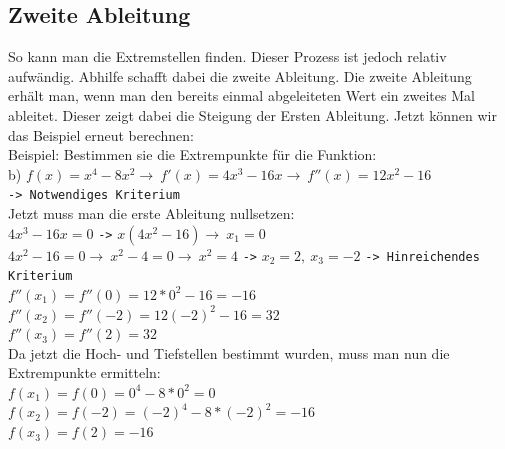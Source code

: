 \documentclass{article}
\begin{document}
	\subsection{Zweite Ableitung}
	So kann man die Extremstellen finden. Dieser Prozess ist jedoch relativ aufwändig. Abhilfe schafft dabei die zweite Ableitung. Die zweite Ableitung erhält man, wenn man den bereits einmal abgeleiteten Wert ein zweites Mal ableitet. Dieser zeigt dabei die Steigung der Ersten Ableitung. 
	Jetzt können wir das Beispiel erneut berechnen: \\
	Beispiel: Bestimmen sie die Extrempunkte für die Funktion: \\
	b) $f(x)=x^4-8x^2\to\ f'(x)=4x^3-16x\to\ f''(x)=12x^2-16$ \\
	\verb|-> Notwendiges Kriterium| \\
	Jetzt muss man die erste Ableitung nullsetzen: \\
	$4x^3-16x=0$ \verb|->| $x(4x^2-16)\to\ x_1=0$ \\
	$4x^2-16=0\to\ x^2-4=0\to\ x^2=4$ \verb|->| $x_2=2,\ x_3=-2$
	\verb|-> Hinreichendes Kriterium| \\
	$f''(x_1)=f''(0)=12*0^2-16=-16$ \\
	$f''(x_2)=f''(-2)=12(-2)^2-16=32$ \\
	$f''(x_3)=f''(2)=32$ \\
	Da jetzt die Hoch- und Tiefstellen bestimmt wurden, muss man nun die Extrempunkte ermitteln: \\
	$f(x_1)=f(0)=0^4-8*0^2=0$ \\
	$f(x_2)=f(-2)=(-2)^4-8*(-2)^2=-16$ \\
	$f(x_3)=f(2)=-16$
\end{document}
